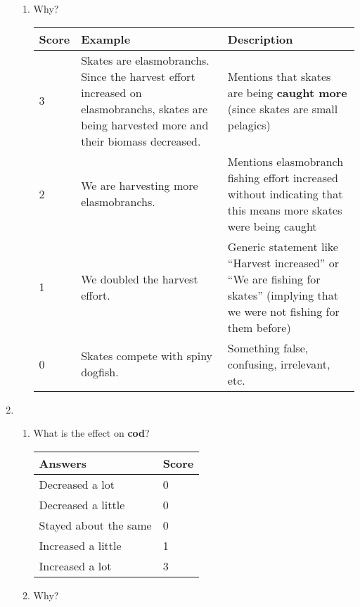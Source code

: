 \begin{enumerate}
\begin{enumerate}
\item Why?


\begin{tabular}{| l | p{5.25cm} | p{5.7cm} |} \hline
\rowcolor{violet!35} \textbf{Score} & \textbf{Example} & \textbf{Description} \\ \hline
3 & Skates are elasmobranchs.  Since the harvest effort increased on elasmobranchs, skates are being harvested more and their biomass decreased. & Mentions that skates are being \textbf{caught more} (since skates are small pelagics)  \\ 
2 & We are harvesting more elasmobranchs. & Mentions elasmobranch fishing effort increased without indicating that this means more skates were being caught \\ 
1 & We doubled the harvest effort. & Generic statement like ``Harvest increased'' or ``We are fishing for skates'' (implying that we were not fishing for them before) \\ 
0 & Skates compete with spiny dogfish. & Something false, confusing, irrelevant, etc. \\
\hline
\end{tabular}

\end{enumerate}

\item 
\begin{enumerate}
\item What is the effect on \textbf{cod}?

\begin{tabular}{| l | l |} \hline
\rowcolor{violet!35} \textbf{Answers} & \textbf{Score} \\ \hline
Decreased a lot & 0 \\ 
Decreased a little & 0 \\ 
Stayed about the same & 0 \\ 
Increased a little & 1 \\
Increased a lot & 3 \\
\hline
\end{tabular}

\item Why?


\end{enumerate}
\end{enumerate}
